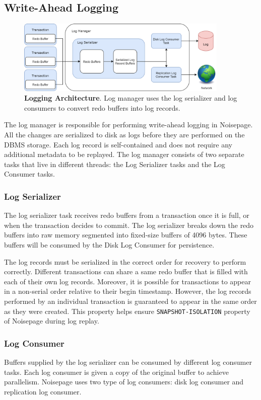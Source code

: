 \documentclass[12pt]{cmuthesis}
\begin{document}
\subsection{Write-Ahead Logging}
\begin{figure}[H]
\centering
\includegraphics[width=0.9\textwidth]{images/WAL.png}
\caption{\textbf{Logging Architecture}. Log manager uses the log serializer and log consumers to convert redo buffers into log records.}
\label{fig:wal}
\end{figure}

The log manager is responsible for performing write-ahead logging in Noisepage. All the changes are serialized to disk as logs before they are performed on the DBMS storage. Each log record is self-contained and does not require any additional metadata to be replayed. The log manager consists of two separate tasks that live in different threads: the Log Serializer tasks and the Log Consumer tasks.

\subsubsection{Log Serializer}
The log serializer task receives redo buffers from a transaction once it is full, or when the transaction decides to commit. The log serializer breaks down the redo buffers into raw memory segmented into fixed-size buffers of 4096 bytes. These buffers will be consumed by the Disk Log Consumer for persistence.

The log records must be serialized in the correct order for recovery to perform correctly. Different transactions can share a same redo buffer that is filled with each of their own log records. Moreover, it is possible for transactions to appear in a non-serial order relative to their begin timestamp. However, the log records performed by an individual transaction is guaranteed to appear in the same order as they were created. This property helps ensure \texttt{SNAPSHOT-ISOLATION} property of Noisepage during log replay.
\subsubsection{Log Consumer}
Buffers supplied by the log serializer can be consumed by different log consumer tasks. Each log consumer is given a copy of the original buffer to achieve parallelism. Noisepage uses two type of log consumers: disk log consumer and replication log consumer.
\end{document}
